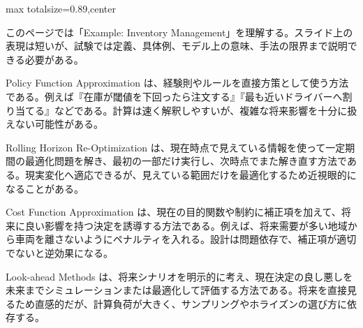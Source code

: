\begin{minipage}[t]{0.58\textwidth}
\begin{adjustbox}{max totalsize={\textwidth}{0.89\textheight},center}
\begin{minipage}{\textwidth}\scriptsize
{}このページでは「Example: Inventory Management」を理解する。スライド上の表現は短いが、試験では定義、具体例、モデル上の意味、手法の限界まで説明できる必要がある。\par
Policy Function Approximation は、経験則やルールを直接方策として使う方法である。例えば『在庫が閾値を下回ったら注文する』『最も近いドライバーへ割り当てる』などである。計算は速く解釈しやすいが、複雑な将来影響を十分に扱えない可能性がある。\par
Rolling Horizon Re-Optimization は、現在時点で見えている情報を使って一定期間の最適化問題を解き、最初の一部だけ実行し、次時点でまた解き直す方法である。現実変化へ適応できるが、見えている範囲だけを最適化するため近視眼的になることがある。\par
Cost Function Approximation は、現在の目的関数や制約に補正項を加えて、将来に良い影響を持つ決定を誘導する方法である。例えば、将来需要が多い地域から車両を離さないようにペナルティを入れる。設計は問題依存で、補正項が適切でないと逆効果になる。\par
Look-ahead Methods は、将来シナリオを明示的に考え、現在決定の良し悪しを未来までシミュレーションまたは最適化して評価する方法である。将来を直接見るため直感的だが、計算負荷が大きく、サンプリングやホライズンの選び方に依存する。\par

\end{minipage}
\end{adjustbox}
\end{minipage}

